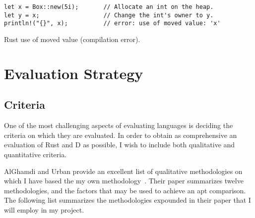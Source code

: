 \documentclass[draftcopy,nolof,nolot]{srpaper}
\begin{document}
\begin{listing}[h]
\begin{verbatim}
let x = Box::new(5i);       // Allocate an int on the heap.
let y = x;                  // Change the int's owner to y.
println!("{}", x);          // error: use of moved value: 'x'
\end{verbatim}
\caption{Rust use of moved value (compilation error).}
\label{lst:rustuseaftermove}
\end{listing}

\chapter{Evaluation Strategy}

\section{Criteria}

One of the most challenging aspects of evaluating languages is deciding the
criteria on which they are evaluated. In order to obtain as comprehensive an
evaluation of Rust and D as possible, I wish to include both qualitative and
quantitative criteria.

AlGhamdi and Urban provide an excellent list of qualitative methodologies on
which I have based the my own
methodology~\cite{AlGhamdi:1993:CAP:162754.162876}. Their paper summarizes
twelve methodologies, and the factors that may be used to achieve an apt
comparison. The following list summarizes the methodologies expounded in their
paper that I will employ in my project.
\end{document}
